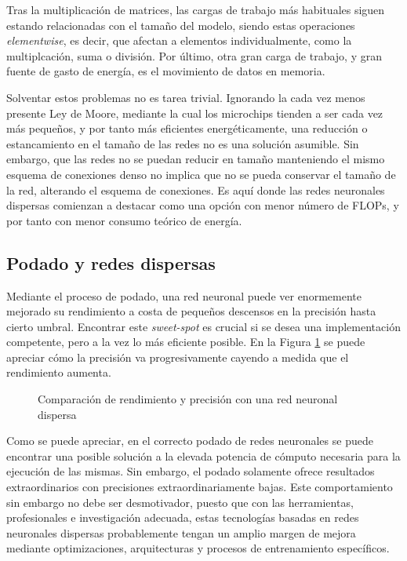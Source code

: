 Tras la multiplicación de matrices, las cargas de trabajo más habituales siguen estando relacionadas con el tamaño del modelo, siendo estas operaciones \textit{elementwise}, es decir, que afectan a elementos individualmente, como la multiplcación, suma o división. Por último, otra gran carga de trabajo, y gran fuente de gasto de energía, es el movimiento de datos en memoria.

Solventar estos problemas no es tarea trivial. Ignorando la cada vez menos presente Ley de Moore, mediante la cual los microchips tienden a ser cada vez más pequeños, y por tanto más eficientes energéticamente, una reducción o estancamiento en el tamaño de las redes no es una solución asumible. Sin embargo, que las redes no se puedan reducir en tamaño manteniendo el mismo esquema de conexiones denso no implica que no se pueda conservar el tamaño de la red, alterando el esquema de conexiones. Es aquí donde las redes neuronales dispersas comienzan a destacar como una opción con menor número de FLOPs, y por tanto con menor consumo teórico de energía.

\subsection{Podado y redes dispersas}
\label{ssec:podado_y_redes_dispersas}
Mediante el proceso de podado, una red neuronal puede ver enormemente mejorado su rendimiento a costa de pequeños descensos en la precisión hasta cierto umbral. Encontrar este \textit{sweet-spot} es crucial si se desea una implementación competente, pero a la vez lo más eficiente posible. En la Figura \ref{fig:grafica_sparse_vs_dense} \cite{neuralmagic_pruning_overview} se puede apreciar cómo la precisión va progresivamente cayendo a medida que el rendimiento aumenta.

\begin{figure}[h!]
    \centering
    \vspace*{0.5cm}
    \def\svgwidth{0.9\textwidth}
    
    \caption{Comparación de rendimiento y precisión con una red neuronal dispersa}
    \label{fig:grafica_sparse_vs_dense}
\end{figure}

Como se puede apreciar, en el correcto podado de redes neuronales se puede encontrar una posible solución a la elevada potencia de cómputo necesaria para la ejecución de las mismas. Sin embargo, el podado solamente ofrece resultados extraordinarios con precisiones extraordinariamente bajas. Este comportamiento sin embargo no debe ser desmotivador, puesto que con las herramientas, profesionales e investigación adecuada, estas tecnologías basadas en redes neuronales dispersas probablemente tengan un amplio margen de mejora mediante optimizaciones, arquitecturas y procesos de entrenamiento específicos.

